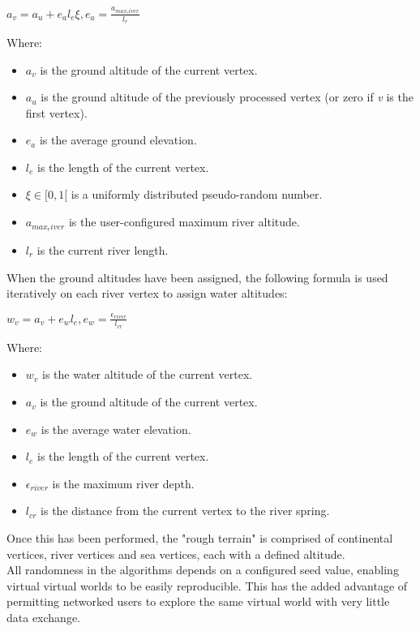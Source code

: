 $a_{v} = a_{u} + e_{a}l_{e}\xi , e_{a} = \frac{a_{max_river}}{l_{r}} $

Where:
\begin{itemize}
\item $a_{v}$ is the ground altitude of the current vertex.
\item $a_{u}$ is the ground altitude of the previously processed vertex (or zero if \textit{v} is the first vertex).
\item $e_{a}$ is the average ground elevation.
\item $l_{e}$ is the length of the current vertex.
\item $\xi \in [0,1[$ is a uniformly distributed pseudo-random number.
\item $a_{max_river}$ is the user-configured maximum river altitude.
\item $l_{r}$ is the current river length.
\end{itemize}

When the ground altitudes have been assigned, the following formula is used iteratively on each river vertex to assign water altitudes:

$w_{v} = a_{v} + e_{w}l_{e}, e_{w} = \frac{\epsilon_{river}}{l_{cr}} $

Where:
\begin{itemize}
\item $w_{v}$ is the water altitude of the current vertex.
\item $a_{v}$ is the ground altitude of the current vertex.
\item $e_{w}$ is the average water elevation.
\item $l_{e}$ is the length of the current vertex.
\item $\epsilon_{river}$ is the maximum river depth.
\item $l_{cr}$ is the distance from the current vertex to the river spring.
\end{itemize}

Once this has been performed, the "rough terrain" is comprised of continental vertices, river vertices and sea vertices, each with a defined altitude.\\

All randomness in the algorithms depends on a configured seed value, enabling virtual virtual worlds to be easily reproducible. This has the added advantage of permitting networked users to explore the same virtual world with very little data exchange. \\


